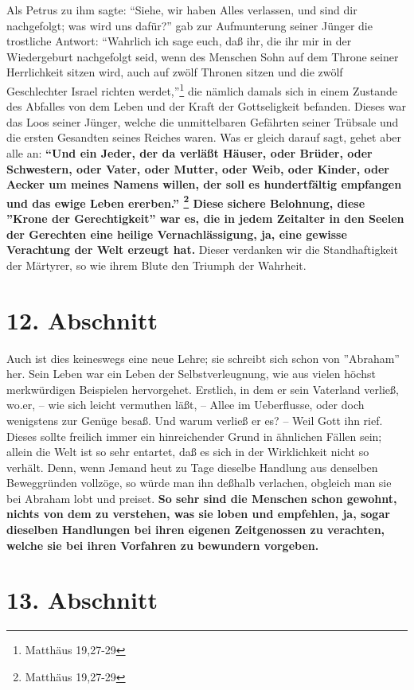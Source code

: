 Als Petrus zu ihm sagte: "`Siehe, wir haben Alles verlassen, und sind dir
nachgefolgt; was wird uns dafür?"' gab zur Aufmunterung seiner Jünger die
trostliche Antwort: "`Wahrlich ich sage euch, daß ihr, die ihr mir in der
Wiedergeburt nachgefolgt seid, wenn des Menschen Sohn auf dem Throne seiner
Herrlichkeit sitzen wird, auch auf zwölf Thronen sitzen und die zwölf
Geschlechter Israel richten werdet,"'\footnote{Matthäus  19,27-29} die nämlich
damals sich in einem Zustande des Abfalles von dem Leben und der Kraft der
Gottseligkeit befanden. Dieses war das Loos seiner Jünger, welche die
unmittelbaren Gefährten seiner Trübsale und die ersten Gesandten seines
Reiches waren. Was er gleich darauf sagt, gehet aber alle an:\textbf{ "`Und ein
Jeder, der da verläßt Häuser, oder Brüder, oder Schwestern, oder Vater, oder
Mutter, oder Weib, oder Kinder, oder Aecker um meines Namens willen, der
soll es hundertfältig empfangen und das ewige Leben ererben."'
\footnote{Matthäus  19,27-29} Diese sichere Belohnung, diese ''Krone der
Gerechtigkeit'' war es, die in jedem Zeitalter in den Seelen der Gerechten
eine heilige Vernachlässigung, ja, eine gewisse Verachtung der Welt erzeugt
hat.} Dieser verdanken wir die Standhaftigkeit der Märtyrer, so wie ihrem
Blute den Triumph der Wahrheit.

\section{12. Abschnitt} \label{kap4_ab12}

Auch ist dies keineswegs eine neue Lehre; sie schreibt sich schon von
''Abraham'' her. Sein Leben war ein Leben der Selbstverleugnung, wie aus vielen
höchst merkwürdigen Beispielen hervorgehet. Erstlich, in dem er sein Vaterland
verließ, wo.er, -- wie sich leicht vermuthen läßt, -- Allee im Ueberflusse, oder
doch wenigstens zur Genüge besaß. Und warum verließ er es? -- Weil Gott ihn
rief. Dieses sollte freilich immer ein hinreichender Grund in ähnlichen Fällen
sein; allein die Welt ist so sehr entartet, daß es sich in der Wirklichkeit
nicht so verhält. Denn, wenn Jemand heut zu Tage dieselbe Handlung aus denselben
Beweggründen vollzöge, so würde man ihn deßhalb verlachen, obgleich man sie bei
Abraham lobt und preiset. \textbf{So sehr sind die Menschen schon gewohnt, nichts von
dem zu verstehen, was sie loben und empfehlen, ja, sogar dieselben Handlungen
bei ihren eigenen Zeitgenossen zu verachten, welche sie bei ihren Vorfahren zu
bewundern vorgeben.}

\section{13. Abschnitt} \label{kap4_ab13}

